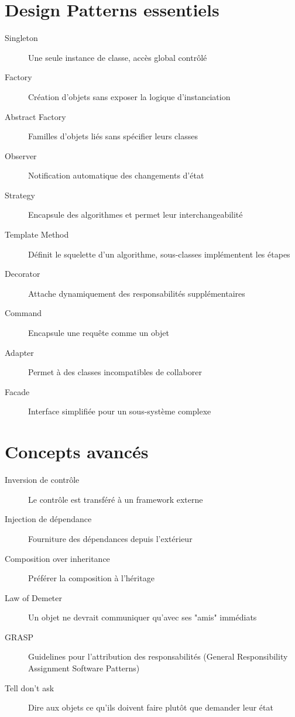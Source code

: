 \documentclass{article}
\begin{document}
\begin{multicols*}{3}
\section*{Design Patterns essentiels}
\begin{description}
\item[Singleton] Une seule instance de classe, accès global contrôlé
\item[Factory] Création d'objets sans exposer la logique d'instanciation
\item[Abstract Factory] Familles d'objets liés sans spécifier leurs classes
\item[Observer] Notification automatique des changements d'état
\item[Strategy] Encapsule des algorithmes et permet leur interchangeabilité
\item[Template Method] Définit le squelette d'un algorithme, sous-classes implémentent les étapes
\item[Decorator] Attache dynamiquement des responsabilités supplémentaires
\item[Command] Encapsule une requête comme un objet
\item[Adapter] Permet à des classes incompatibles de collaborer
\item[Facade] Interface simplifiée pour un sous-système complexe
\end{description}

\section*{Concepts avancés}
\begin{description}
\item[Inversion de contrôle] Le contrôle est transféré à un framework externe
\item[Injection de dépendance] Fourniture des dépendances depuis l'extérieur
\item[Composition over inheritance] Préférer la composition à l'héritage
\item[Law of Demeter] Un objet ne devrait communiquer qu'avec ses "amis" immédiats
\item[GRASP] Guidelines pour l'attribution des responsabilités (General Responsibility Assignment Software Patterns)
\item[Tell don't ask] Dire aux objets ce qu'ils doivent faire plutôt que demander leur état
\end{description}


\end{multicols*}
\end{document}
